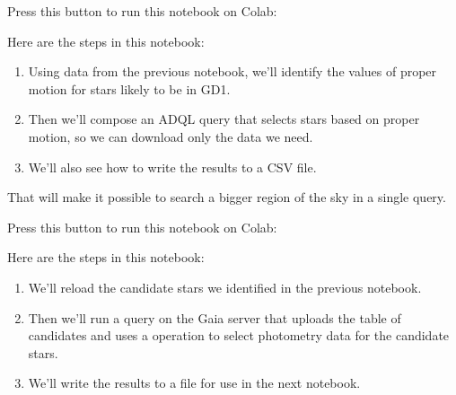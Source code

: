 \documentclass[letterpaper,10pt,english]{sphinxmanual}
\begin{document}
Press this button to run this notebook on Colab:




Here are the steps in this notebook:
\begin{enumerate}
%
\item {} 
Using data from the previous notebook, we’ll identify the values of proper motion for stars likely to be in GD\sphinxhyphen{}1.

\item {} 
Then we’ll compose an ADQL query that selects stars based on proper motion, so we can download only the data we need.

\item {} 
We’ll also see how to write the results to a CSV file.

\end{enumerate}

That will make it possible to search a bigger region of the sky in a single query.

Press this button to run this notebook on Colab:




Here are the steps in this notebook:
\begin{enumerate}
%
\item {} 
We’ll reload the candidate stars we identified in the previous notebook.

\item {} 
Then we’ll run a query on the Gaia server that uploads the table of candidates and uses a  operation to select photometry data for the candidate stars.

\item {} 
We’ll write the results to a file for use in the next notebook.

\end{enumerate}
\end{document}
